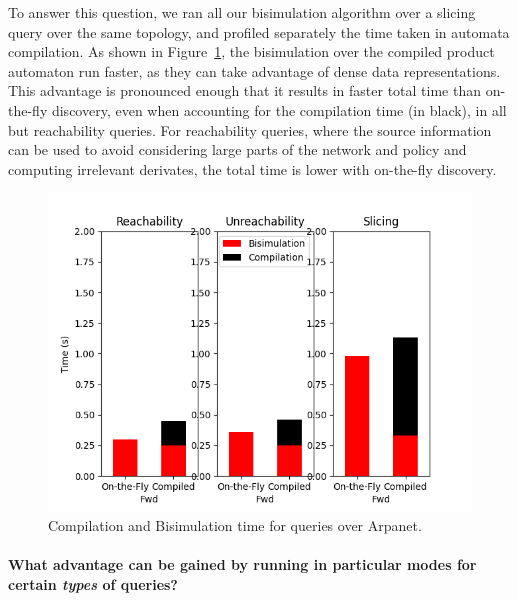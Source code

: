 To answer this question, we ran all our bisimulation algorithm over a slicing query over the same topology, and profiled separately the time taken in
automata compilation. As shown in Figure~\ref{fig:graph-Q1}, the
bisimulation over the compiled product automaton run faster, as they
can take advantage of dense data representations. This advantage is pronounced enough that it results in faster total time than on-the-fly discovery, even when accounting for the compilation time (in black), in all but reachability queries. For reachability queries, where the source information can be used to avoid considering large parts of the network and policy and computing irrelevant derivates, the total time is lower with on-the-fly discovery.




\begin{figure}[ht]
\begin{center}
\includegraphics[scale=0.5]{figures/rq1.png}
\end{center}
\caption{Compilation and Bisimulation time for queries over Arpanet.}
\label{fig:graph-Q1}
\end{figure}





\paragraph{What advantage can be gained by running \FiveStars in particular modes for
      certain \emph{types} of queries?}

